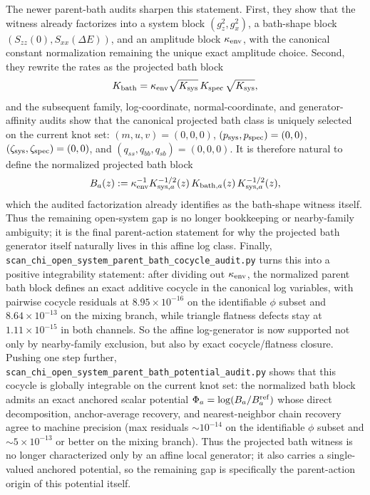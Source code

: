 \documentclass[aps,prd,onecolumn,notitlepage,nofootinbib,superscriptaddress,11pt,floatfix]{revtex4-2}
\begin{document}
The newer parent-bath audits sharpen this statement. First, they show that the witness already factorizes into a system block $(g_z^2,g_x^2)$, a bath-shape block $(S_{zz}(0),S_{xx}(\Delta E))$, and an amplitude block $\kappa_{\rm env}$, with the canonical constant normalization remaining the unique exact amplitude choice. Second, they rewrite the rates as the projected bath block
\[
K_{\rm bath}=\kappa_{\rm env}\sqrt{K_{\rm sys}}\,K_{\rm spec}\,\sqrt{K_{\rm sys}},
\label{eq:chi_parent_bath_block}
\]
and the subsequent family, log-coordinate, normal-coordinate, and generator-affinity audits show that the canonical projected bath class is uniquely selected on the current knot set: $(m,u,v)=(0,0,0)$, $(p_{\rm sys},p_{\rm spec})=(0,0)$, $(\zeta_{\rm sys},\zeta_{\rm spec})=(0,0)$, and $(q_{ss},q_{bb},q_{sb})=(0,0,0)$. It is therefore natural to define the normalized projected bath block
\[
B_a(z):=\kappa_{\rm env}^{-1}K_{{\rm sys},a}^{-1/2}(z)\,K_{{\rm bath},a}(z)\,K_{{\rm sys},a}^{-1/2}(z),
\]
which the audited factorization already identifies as the bath-shape witness itself. Thus the remaining open-system gap is no longer bookkeeping or nearby-family ambiguity; it is the final parent-action statement for why the projected bath generator itself naturally lives in this affine log class.
Finally, \texttt{scan\_chi\_open\_system\_parent\_bath\_cocycle\_audit.py} turns this into a positive integrability statement: after dividing out $\kappa_{\rm env}$, the normalized parent bath block defines an exact additive cocycle in the canonical log variables, with pairwise cocycle residuals at $8.95\times10^{-16}$ on the identifiable $\phi$ subset and $8.64\times10^{-13}$ on the mixing branch, while triangle flatness defects stay at $1.11\times10^{-15}$ in both channels. So the affine log-generator is now supported not only by nearby-family exclusion, but also by exact cocycle/flatness closure.
Pushing one step further, \texttt{scan\_chi\_open\_system\_parent\_bath\_potential\_audit.py} shows that this cocycle is globally integrable on the current knot set: the normalized bath block admits an exact anchored scalar potential $\Phi_a=\log(B_a/B_a^{\rm ref})$ whose direct decomposition, anchor-average recovery, and nearest-neighbor chain recovery agree to machine precision (max residuals $\sim10^{-14}$ on the identifiable $\phi$ subset and $\sim5\times10^{-13}$ or better on the mixing branch). Thus the projected bath witness is no longer characterized only by an affine local generator; it also carries a single-valued anchored potential, so the remaining gap is specifically the parent-action origin of this potential itself.
\end{document}
